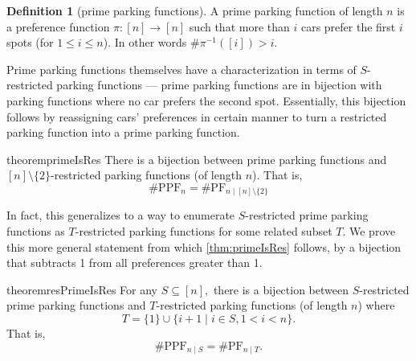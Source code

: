 \documentclass[12 pt]{amsart}
\theoremstyle{definition} %
\newtheorem{definition}[theorem]{Definition}
\theoremstyle{remark} %
\begin{document}
\begin{definition}[prime parking functions]
	A prime parking function of length $n$ is a preference function $\pi : [n] \to [n]$ such that more than $i$ cars prefer the first $i$ spots (for $1 \le i \le n$). In other words $\# \pi^{-1}([i]) > i$.
\end{definition}

Prime parking functions themselves have a characterization in terms of $S$-restricted parking functions --- prime parking functions are in bijection with parking functions where no car prefers the second spot. Essentially, this bijection follows by reassigning cars' preferences in certain manner to turn a restricted parking function into a prime parking function.

\begin{restatable}{theorem}{primeIsRes}
    \label{thm:primeIsRes}
	There is a bijection between prime parking functions and $[n] \setminus \{ 2 \}$-restricted parking functions (of length $n$). That is,
	\[
		\# \mathrm{PPF}_{n} = \# \mathrm{PF}_{n \mid [n] \setminus \{ 2 \}} 
	\]
\end{restatable}

In fact, this generalizes to a way to enumerate $S$-restricted prime parking functions as $T$-restricted parking functions for some related subset $T$. We prove this more general statement from which \cref{thm:primeIsRes} follows, by a bijection that subtracts 1 from all preferences greater than 1. 

\begin{restatable}{theorem}{resPrimeIsRes}
	For any $S\subseteq [n],$  there is a bijection between $S$-restricted prime parking functions and $T$-restricted parking functions (of length $n$) where
	\[
		T = \{ 1 \} \cup \{ i + 1 \mid i \in S, 1 < i < n \}.
	\]
	That is,
	\[
		\# \mathrm{PPF}_{n \mid S} = \# \mathrm{PF}_{n \mid T}.
	\]
\end{restatable}
\end{document}

